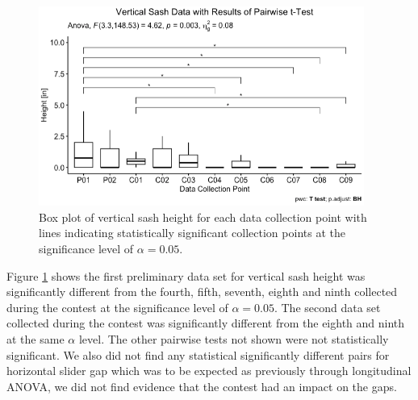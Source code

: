 \documentclass[12pt, twocolumn]{article}
\begin{document}
\begin{figure}[ht]	
	\centering
	\includegraphics[width=0.95\textwidth]{Images/FumeHoodAnalysis_PairwiseTTestSash.png}
	\captionsetup{width=.9\linewidth}
	\caption{Box plot of vertical sash height for each data collection point with lines indicating statistically significant collection points at the significance level of $\alpha = 0.05$. }
	\label{Fig:PairwsieTTestSash}
\end{figure}
Figure \ref{Fig:PairwsieTTestSash} shows the first preliminary data set for vertical sash height was significantly different from the fourth, fifth, seventh, eighth and ninth collected during the contest at the significance level of $\alpha = 0.05$. The second data set collected during the contest was significantly different from the eighth and ninth at the same $\alpha$ level. The other pairwise tests not shown were not statistically significant. We also did not find any statistical significantly different pairs for horizontal slider gap which was to be expected as previously through longitudinal ANOVA, we did not find evidence that the contest had an impact on the gaps. 
\end{document}
